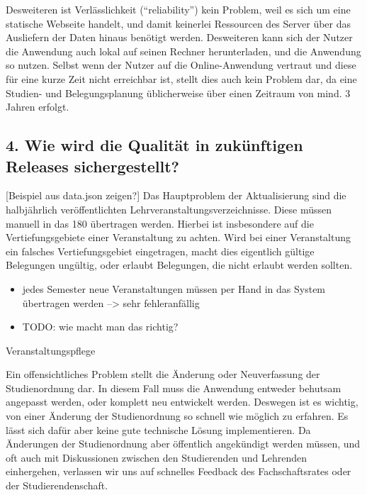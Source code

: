 \documentclass[]{article}
\begin{document}
Desweiteren ist Verlässlichkeit (``reliability'') kein Problem, weil es
sich um eine statische Webseite handelt, und damit keinerlei Ressourcen
des Server über das Ausliefern der Daten hinaus benötigt werden.
Desweiteren kann sich der Nutzer die Anwendung auch lokal auf seinen
Rechner herunterladen, und die Anwendung so nutzen. Selbst wenn der
Nutzer auf die Online-Anwendung vertraut und diese für eine kurze Zeit
nicht erreichbar ist, stellt dies auch kein Problem dar, da eine
Studien- und Belegungsplanung üblicherweise über einen Zeitraum von
mind. 3 Jahren erfolgt.

\subsection{4. Wie wird die Qualität in zukünftigen Releases
sichergestellt?}\label{wie-wird-die-qualituxe4t-in-zukuxfcnftigen-releases-sichergestellt}

{[}Beispiel aus data.json zeigen?{]} Das Hauptproblem der Aktualisierung
sind die halbjährlich veröffentlichten Lehrveranstaltungsverzeichnisse.
Diese müssen manuell in das 180 übertragen werden. Hierbei ist
insbesondere auf die Vertiefungsgebiete einer Veranstaltung zu achten.
Wird bei einer Veranstaltung ein falsches Vertiefungsgebiet eingetragen,
macht dies eigentlich gültige Belegungen ungültig, oder erlaubt
Belegungen, die nicht erlaubt werden sollten.

\begin{itemize}
\itemsep1pt\parskip0pt
\item
  jedes Semester neue Veranstaltungen müssen per Hand in das System
  übertragen werden --\textgreater{} sehr fehleranfällig
\item
  TODO: wie macht man das richtig?
\end{itemize}

Veranstaltungspflege

Ein offensichtliches Problem stellt die Änderung oder Neuverfassung der
Studienordnung dar. In diesem Fall muss die Anwendung entweder behutsam
angepasst werden, oder komplett neu entwickelt werden. Deswegen ist es
wichtig, von einer Änderung der Studienordnung so schnell wie möglich zu
erfahren. Es lässt sich dafür aber keine gute technische Lösung
implementieren. Da Änderungen der Studienordnung aber öffentlich
angekündigt werden müssen, und oft auch mit Diskussionen zwischen den
Studierenden und Lehrenden einhergehen, verlassen wir uns auf schnelles
Feedback des Fachschaftsrates oder der Studierendenschaft.
\end{document}
